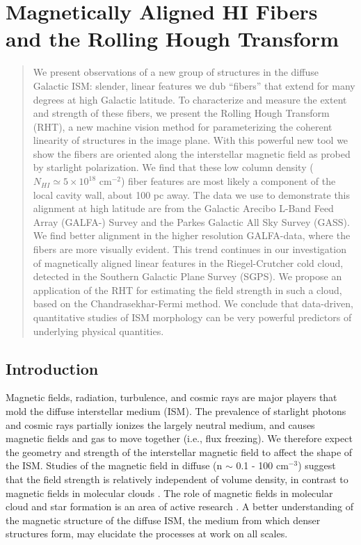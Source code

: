 \chapter[Magnetically Aligned HI Fibers and the Rolling Hough Transform]{Magnetically Aligned HI Fibers and the Rolling Hough Transform\label{ch:fibers_RHT}}
\let\thefootnote\relax{}

\begin{abstract}
We present observations of a new group of structures in the diffuse Galactic ISM: slender, linear \hi features we dub ``fibers'' that extend for many degrees at high Galactic latitude. To characterize and measure the extent and strength of these fibers, we present the Rolling Hough Transform (RHT), a new machine vision method for parameterizing the coherent linearity of structures in the image plane. With this powerful new tool we show the fibers are oriented along the interstellar magnetic field as probed by starlight polarization. We find that these low column density ($N_{HI} \simeq  5 \times 10^{18}$ cm$^{-2}$) fiber features are most likely a component of the local cavity wall, about 100 pc away. The \hi data we use to demonstrate this alignment at high latitude are from the Galactic Arecibo L-Band Feed Array \hi (GALFA-\hia) Survey and the Parkes Galactic All Sky Survey (GASS). We find better alignment in the higher resolution GALFA-\hi data, where the fibers are more visually evident. This trend continues in our investigation of magnetically aligned linear features in the Riegel-Crutcher \hi cold cloud, detected in the Southern Galactic Plane Survey (SGPS). We propose an application of the RHT for estimating the field strength in such a cloud, based on the Chandrasekhar-Fermi method. We conclude that data-driven, quantitative studies of ISM morphology can be very powerful predictors of underlying physical quantities.
\end{abstract}


\section{Introduction}

Magnetic fields, radiation, turbulence, and cosmic rays are major players that mold the diffuse interstellar medium (ISM). The prevalence of starlight photons and cosmic rays partially ionizes the largely neutral medium, and causes magnetic fields and gas to move together (i.e., flux freezing). We therefore expect the geometry and strength of the interstellar magnetic field to affect the shape of the ISM. Studies of the magnetic field in diffuse \hi (n ${\sim}$ 0.1 - 100 cm${^{-3}}$) suggest that the field strength is relatively independent of volume density, in contrast to magnetic fields in molecular clouds \citep[e.g.,][]{Heiles:2005tb}. The role of magnetic fields in molecular cloud and star formation is an area of active research \citep[see][for a recent review]{Crutcher:2012hw}. A better understanding of the magnetic structure of the diffuse ISM, the medium from which denser structures form, may elucidate the processes at work on all scales. 

